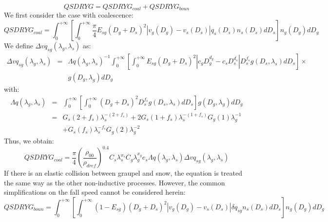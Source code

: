 \begin{equation}
  QSDRYG = QSDRYG_{coal} + QSDRYG_{boun}
\end{equation}
We first consider the case with coalescence:
\begin{equation}
  QSDRYG_{coal} = \int_0 ^{+ \infty} \left[ \int_0 ^{+ \infty} 
                  \frac{\pi}{4} E_{sg} (D_g + D_s)^2 |v_g (D_g) - v_s (D_s)|
                  q_s (D_s) n_s (D_s) dD_s \right] n_g (D_g) dD_g \nonumber
\end{equation}
We define $\Delta vq_{sg} (\lambda _g, \lambda _s)$ as:
\begin{eqnarray}
  \Delta vq_{sg} (\lambda _g, \lambda _s) & = &
  \Lambda q(\lambda _g, \lambda _s)^{-1}  \int_0 ^{+ \infty} \left[ 
    \int_0 ^{+ \infty} E_{sg} (D_g + D_s)^2
    |c_g D_g ^{d_g} - c_s D_s ^{d_s}| D_s ^{f_s} g(D_s , \lambda_s) dD_s
    \right] \times \nonumber \\
    & &  g(D_g , \lambda_g) dD_g
\end{eqnarray}
with:
\begin{eqnarray}
  \Lambda q(\lambda _g, \lambda _s) &=& \int_0 ^{+ \infty} \left[ 
    \int_0 ^{+ \infty} (D_g + D_s)^2 D_s ^{f_s} g(D_s , \lambda_s) dD_s
    \right] g(D_g , \lambda_g) dD_g \nonumber \\
   &=& G_s (2 + f_s) \lambda _s ^{-(2+f_s)} + 
       2 G_s (1 + f_s) \lambda _s ^{-(1+f_s)} G_g (1) \lambda _g ^{-1} \nonumber \\
   & & + G_s (f_s) \lambda _s ^{-f_s} G_g (2) \lambda _g ^{-2}
\end{eqnarray}
Thus, we obtain:
\begin{equation}
  QSDRYG_{coal} = \frac{\pi}{4}
                  \left( \frac{\rho _{00}}{\rho _{dref}} \right)^{0.4}
                  C_s \lambda _s ^{x_s} C_g \lambda _g ^{x_g} e_s
                  \Lambda q(\lambda _g, \lambda _s)
                  \Delta vq_{sg} (\lambda _g, \lambda _s)
\end{equation}
If there is an elastic collision between graupel and snow, the equation is treated the same way as the other non-inductive processes.
However, the common simplifications on the fall speed cannot be considered herein:
\begin{equation}
  QSDRYG_{boun} = \int_0 ^{+ \infty} \left[ \int_0 ^{+ \infty}
                  (1 - E_{sg}) (D_g + D_s)^2 |v_g (D_g) - v_s (D_s)|
                  \delta q_{sg} n_s (D_s) dD_s \right] n_g (D_g) dD_g
\end{equation}

